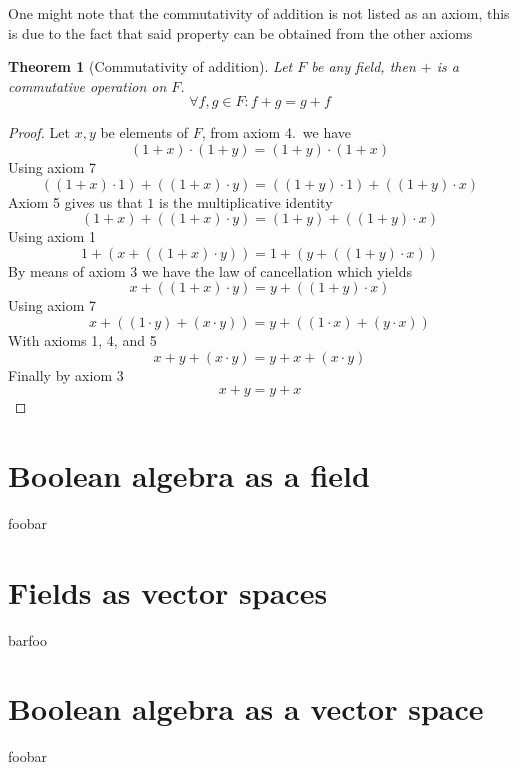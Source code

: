 \documentclass{article}
\newtheorem*{theorem}{Theorem}
\begin{document}
One might note that the commutativity of addition is not listed as an axiom,
this is due to the fact that said property can be obtained from the other axioms

\begin{theorem}[Commutativity of addition]
  Let $F$ be any field, then $+$ is a commutative operation on $F$.
  $$\forall f,g \in F :  f + g = g + f$$
\end{theorem}
\begin{proof}
Let $x, y$ be elements of $F$, from axiom 4.\ we have
$$(1+x)\cdot(1+y)=(1+y)\cdot(1+x)$$
Using axiom 7
$$((1+x)\cdot 1)+((1+x)\cdot y) = ((1+y)\cdot 1)+((1+y)\cdot x)$$
Axiom 5 gives us that $1$ is the multiplicative identity
$$(1+x)+((1+x)\cdot y) = (1+y)+((1+y)\cdot x)$$
Using axiom 1
$$1+(x+((1+x)\cdot y)) = 1+(y+((1+y)\cdot x))$$
By means of axiom 3 we have the law of cancellation which yields
$$x+((1+x)\cdot y) = y+((1+y)\cdot x)$$
Using axiom 7
$$x+((1\cdot y)+(x\cdot y)) = y+((1\cdot x)+(y\cdot x))$$
With axioms 1, 4, and 5
$$x+y+(x\cdot y) = y+x+(x\cdot y)$$
Finally by axiom 3
$$x+y=y+x$$
\end{proof}
\section{Boolean algebra as a field}
\label{sec:Boolean algebra as a field}

foobar

\section{Fields as vector spaces}
\label{sec:Fields as vector spaces}

barfoo

\section{Boolean algebra as a vector space}
\label{sec:Boolean algebra as a vector space}

foobar
\end{document}
